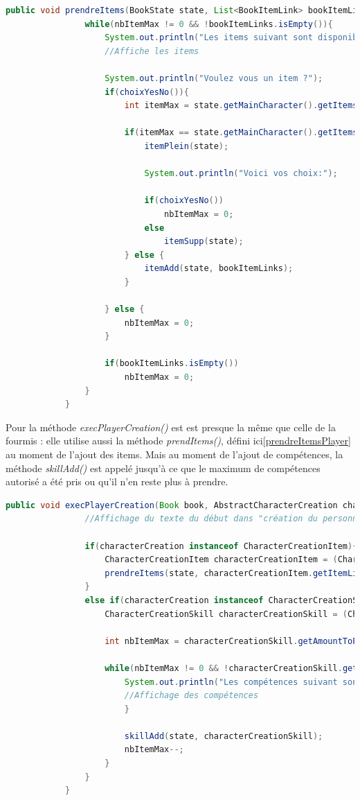 		\begin{lstlisting}[gobble=12, language=java, label=prendreItemsPlayer, caption=prendreItems() du Player]
			public void prendreItems(BookState state, List<BookItemLink> bookItemLinks, int nbItemMax){
				while(nbItemMax != 0 && !bookItemLinks.isEmpty()){
					System.out.println("Les items suivant sont disponible:");
					//Affiche les items

					System.out.println("Voulez vous un item ?");
					if(choixYesNo()){
						int itemMax = state.getMainCharacter().getItemsMax();

						if(itemMax == state.getMainCharacter().getItems().size()){
							itemPlein(state);

							System.out.println("Voici vos choix:");

							if(choixYesNo())
								nbItemMax = 0;
							else
								itemSupp(state);
						} else {
							itemAdd(state, bookItemLinks);
						}

					} else {
						nbItemMax = 0;
					}

					if(bookItemLinks.isEmpty())
						nbItemMax = 0;
				}
			}

		\end{lstlisting}

		Pour la méthode \textit{execPlayerCreation()} est est presque la même que celle de la fourmis : elle utilise aussi la méthode \textit{prendItems()}, défini ici\ref{prendreItemsPlayer} au moment de l'ajout des items. Mais au moment de l'ajout de compétences, la méthode \textit{skillAdd()} est appelé jusqu'à ce que le maximum de compétences autorisé a été pris ou qu'il n'en reste plus à prendre.\\

		\begin{lstlisting}[gobble=12, language=java, label=execPlayerCreationPlayer, caption=execPlayerCreation() du Player]
			public void execPlayerCreation(Book book, AbstractCharacterCreation characterCreation, BookState state){
				//Affichage du texte du début dans "création du personnage"

				if(characterCreation instanceof CharacterCreationItem){
					CharacterCreationItem characterCreationItem = (CharacterCreationItem) characterCreation;
					prendreItems(state, characterCreationItem.getItemLinks(), characterCreationItem.getAmountToPick());
				}
				else if(characterCreation instanceof CharacterCreationSkill){
					CharacterCreationSkill characterCreationSkill = (CharacterCreationSkill) characterCreation;

					int nbItemMax = characterCreationSkill.getAmountToPick();

					while(nbItemMax != 0 && !characterCreationSkill.getSkillLinks().isEmpty()){
						System.out.println("Les compétences suivant sont disponible:");
						//Affichage des compétences
						}

						skillAdd(state, characterCreationSkill);
						nbItemMax--;
					}
				}
			}
			\end{lstlisting}

